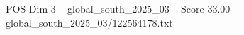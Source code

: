 \begin{textsample}{POS Dim 3 – global\_south\_2025\_03 – Score 33.00 – global\_south\_2025\_03/122564178.txt}
\end{textsample}
